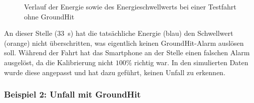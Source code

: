 \begin{figure}[htpb]
	\centering
	\caption{Verlauf der Energie sowie des Energieschwellwerts bei einer Testfahrt ohne GroundHit}
	\label{fig:GH_Testfahrt_noGroundHit_EnergyZoomed}
\end{figure}


An dieser Stelle (\SI[per-mode = symbol]{33}{\second}) hat die tatsächliche Energie (blau) den Schwellwert (orange) nicht überschritten, was eigentlich keinen GroundHit-Alarm auslösen soll. Während der Fahrt hat das Smartphone an der Stelle einen falschen Alarm ausgelöst, da die Kalibrierung nicht $100\%$ richtig war. In den simulierten Daten wurde diese angepasst und hat dazu geführt, keinen Unfall zu erkennen.

\subsubsection{Beispiel 2: Unfall mit GroundHit}


